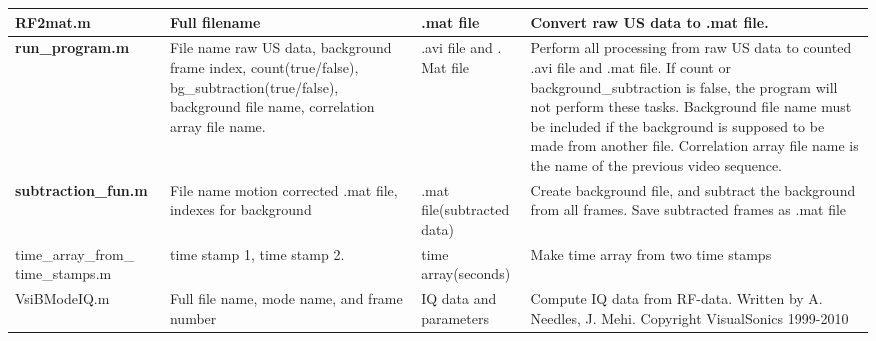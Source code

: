 \begin{center}
\begin{longtable}{@{} p{3cm} p{3cm} p{2cm} p{4cm} @{}}
			\textbf{RF2mat.m} & Full filename & .mat file & Convert raw US data to .mat file. \\ \hline 
			\textbf{run\_program.m} & File name raw US data, background frame index, count(true/false), bg\_subtraction(true/false),  background file name, correlation array file name. & .avi file and . Mat file & Perform all processing from raw US data to counted .avi file and .mat file. If count or background\_subtraction is false, the program will not perform these tasks. Background file name must be included if the background is supposed to be made from another file. Correlation array file name is the name of the previous video sequence. \\ \hline 
			\textbf{subtraction\_fun.m} & File name motion corrected .mat file, indexes for background & .mat file(subtracted data) & Create background file, and subtract the background from all frames. Save subtracted frames as .mat file \\ \hline 
			time\_array\_from\_ time\_stamps.m & time stamp 1, time stamp 2. & time array(seconds) & Make time array from two time stamps \\ \hline 
			VsiBModeIQ.m & Full file name, mode name, and frame number & IQ data and parameters & Compute IQ data from RF-data. Written by A. Needles, J. Mehi. Copyright VisualSonics 1999-2010 \\

		\end{longtable}
		
	\end{center}
	\clearpage